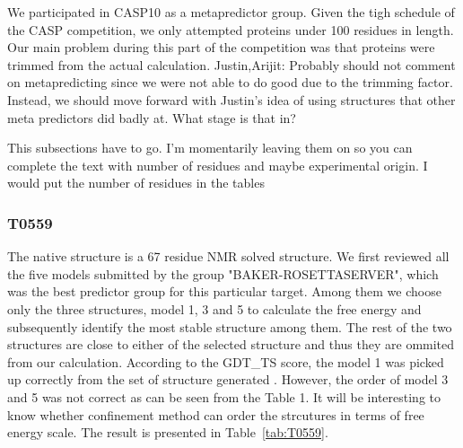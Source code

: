 \documentclass[12pt]{article}
\newcommand{\Alberto}[1]{\color{ForestGreen}#1\normalcolor }
\begin{document}
We participated in CASP10 as a metapredictor group. Given the tigh schedule of the CASP competition,
we only attempted proteins under 100 residues in length. Our main problem during this part of the
competition was that proteins were trimmed from the actual calculation.
\Alberto{Justin,Arijit: Probably should not comment on metapredicting since we were not able to do
    good due to the trimming factor. Instead, we should move forward with Justin's idea of using
    structures that other meta predictors did badly at. What stage is that in?}


\Alberto{This subsections have to go. I'm momentarily leaving them on so you can complete the text
    with number of residues and maybe experimental origin. I would put the number of residues in the
    tables}
\subsubsection{T0559}

The native structure is a  67 residue NMR solved structure. We first reviewed all the five models
submitted by the group "BAKER-ROSETTASERVER", which was the best predictor group for this particular
target.  Among them we choose only the three structures, model 1, 3 and 5 to calculate the free
energy and subsequently identify the most stable structure among them. The rest of the two
structures are close to either of the selected structure and thus they are ommited from our
calculation. According to the GDT\_TS score, the model 1 was picked up correctly from the set of
structure generated . However, the order of model 3 and 5 was not correct as can be seen from the
Table 1. It will be interesting to know whether confinement method can order the strcutures in terms
of free energy scale. The result is presented in Table~\protect\ref{tab:T0559}.
\end{document}
